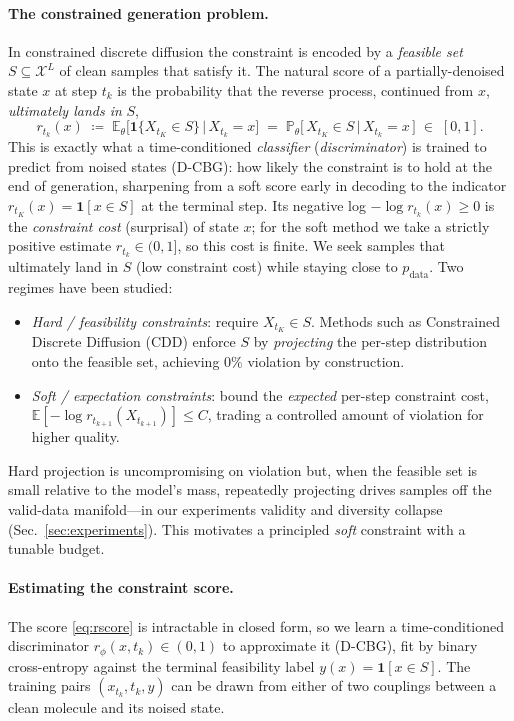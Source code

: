 \documentclass{article}
\newcommand{\E}{\mathbb{E}}
\newcommand{\X}{\mathcal{X}}
\begin{document}
\paragraph{The constrained generation problem.} In constrained discrete diffusion the constraint is encoded by a \emph{feasible set} $S\subseteq\X^L$ of clean samples that satisfy it. The natural score of a partially-denoised state $x$ at step $t_k$ is the probability that the reverse process, continued from $x$, \emph{ultimately lands in} $S$,
\begin{equation}
\label{eq:rscore}
r_{t_k}(x)\;\coloneqq\;\E_\theta\!\big[\mathbf 1\{X_{t_K}\in S\}\,\big|\,X_{t_k}=x\big]
\;=\;\mathbb P_\theta\!\big[\,X_{t_K}\in S \,\big|\, X_{t_k}=x\,\big]\;\in\;[0,1].
\end{equation}
This is exactly what a time-conditioned \emph{classifier} (\emph{discriminator}) is trained to predict from noised states (D-CBG): how likely the constraint is to hold at the end of generation, sharpening from a soft score early in decoding to the indicator $r_{t_K}(x)=\mathbf 1[x\in S]$ at the terminal step. Its negative log $-\log r_{t_k}(x)\ge0$ is the \emph{constraint cost} (surprisal) of state $x$; for the soft method we take a strictly positive estimate $r_{t_k}\in(0,1]$, so this cost is finite. We seek samples that ultimately land in $S$ (low constraint cost) while staying close to $p_{\mathrm{data}}$. Two regimes have been studied:
\begin{itemize}
\item \emph{Hard / feasibility constraints}: require $X_{t_K}\in S$. Methods such as Constrained Discrete Diffusion (CDD) \cite{cardei2025cdd} enforce $S$ by \emph{projecting} the per-step distribution onto the feasible set, achieving $0\%$ violation by construction.
\item \emph{Soft / expectation constraints}: bound the \emph{expected} per-step constraint cost, $\E[-\log r_{t_{k+1}}(X_{t_{k+1}})]\le C$, trading a controlled amount of violation for higher quality.
\end{itemize}
Hard projection is uncompromising on violation but, when the feasible set is small relative to the model's mass, repeatedly projecting drives samples off the valid-data manifold---in our experiments validity and diversity collapse (Sec.~\ref{sec:experiments}). This motivates a principled \emph{soft} constraint with a tunable budget.

\paragraph{Estimating the constraint score.} The score \eqref{eq:rscore} is intractable in closed form, so we learn a time-conditioned discriminator $r_\phi(x,t_k)\in(0,1)$ to approximate it (D-CBG), fit by binary cross-entropy against the terminal feasibility label $y(x)=\mathbf 1[x\in S]$. The training pairs $(x_{t_k},t_k,y)$ can be drawn from either of two couplings between a clean molecule and its noised state.
\end{document}
